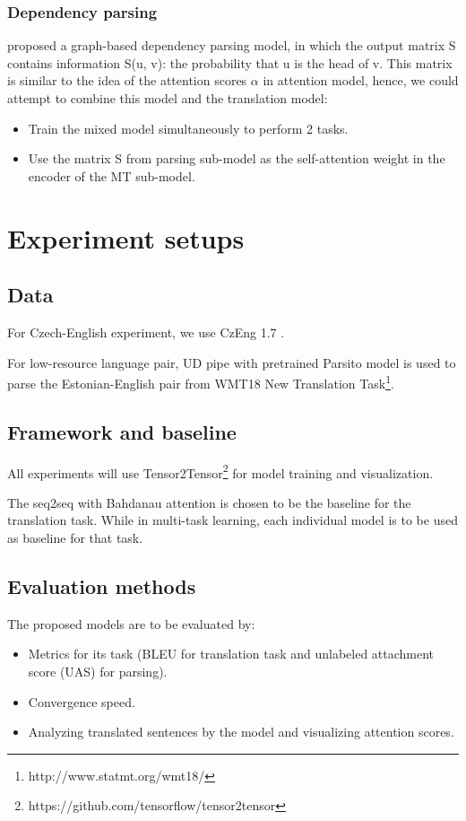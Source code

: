 \documentclass{article}
\begin{document}
\subsubsection{Dependency parsing}
\cite{DBLP:journals/corr/DozatM16} proposed a graph-based dependency parsing model, in which the output matrix S contains information S(u, v): the probability that u is the head of v.
This matrix is similar to the idea of the attention scores $\alpha$ in attention model, hence, we could attempt to combine this model and the translation model:
\begin{itemize}
    \item Train the mixed model simultaneously to perform 2 tasks.
    \item Use the matrix S from parsing sub-model as the self-attention weight in the encoder of the MT sub-model.
\end{itemize}


\section{Experiment setups}

\subsection{Data}
For Czech-English experiment, we use CzEng 1.7 \citep{czeng16:2016}.

For low-resource language pair, UD pipe with pretrained Parsito model \citep{DBLP:conf/conll/StrakaS17} is used to parse the Estonian-English pair from WMT18 New Translation Task\footnote{http://www.statmt.org/wmt18/}.


\subsection{Framework and baseline}
All experiments will use Tensor2Tensor\footnote{https://github.com/tensorflow/tensor2tensor} for model training and visualization.

The seq2seq with Bahdanau attention is chosen to be the baseline for the translation task. While in multi-task learning, each individual model is to be used as baseline for that task.

\subsection{Evaluation methods}
The proposed models are to be evaluated by:
\begin{itemize}
    \item Metrics for its task (BLEU \citep{BLEU} for translation task and unlabeled attachment score (UAS) for parsing).
    \item Convergence speed.
    \item Analyzing translated sentences by the model and visualizing attention scores.
\end{itemize}
\end{document}
